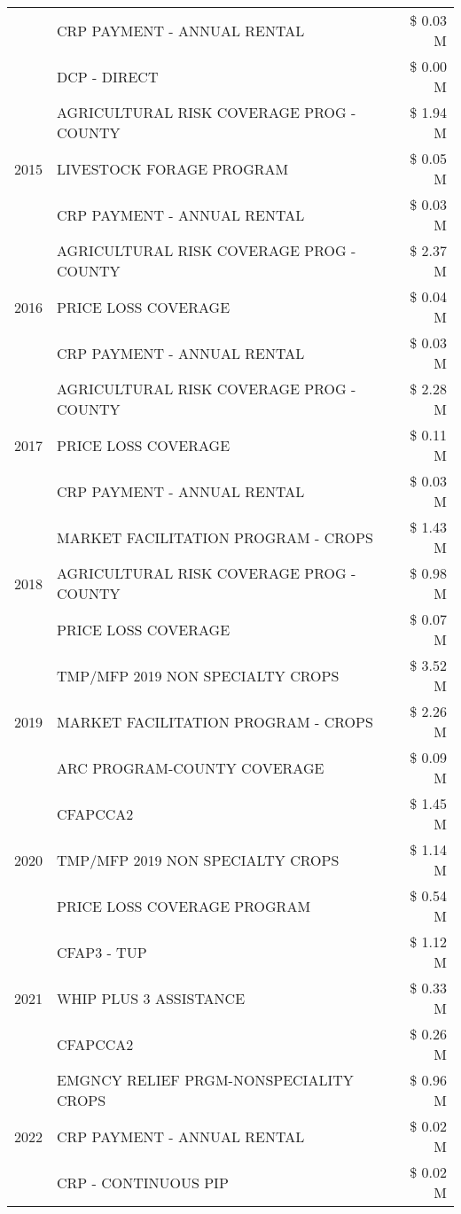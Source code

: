 \begin{tabular}{llr}
 & CRP PAYMENT - ANNUAL RENTAL & \$ 0.03 M \\
 & DCP - DIRECT & \$ 0.00 M \\
\cline{1-3}
\multirow[t]{3}{*}{2015} & AGRICULTURAL RISK COVERAGE PROG - COUNTY & \$ 1.94 M \\
 & LIVESTOCK FORAGE PROGRAM & \$ 0.05 M \\
 & CRP PAYMENT - ANNUAL RENTAL & \$ 0.03 M \\
\cline{1-3}
\multirow[t]{3}{*}{2016} & AGRICULTURAL RISK COVERAGE PROG - COUNTY & \$ 2.37 M \\
 & PRICE LOSS COVERAGE & \$ 0.04 M \\
 & CRP PAYMENT - ANNUAL RENTAL & \$ 0.03 M \\
\cline{1-3}
\multirow[t]{3}{*}{2017} & AGRICULTURAL RISK COVERAGE PROG - COUNTY & \$ 2.28 M \\
 & PRICE LOSS COVERAGE & \$ 0.11 M \\
 & CRP PAYMENT - ANNUAL RENTAL & \$ 0.03 M \\
\cline{1-3}
\multirow[t]{3}{*}{2018} & MARKET FACILITATION PROGRAM - CROPS & \$ 1.43 M \\
 & AGRICULTURAL RISK COVERAGE PROG - COUNTY & \$ 0.98 M \\
 & PRICE LOSS COVERAGE & \$ 0.07 M \\
\cline{1-3}
\multirow[t]{3}{*}{2019} & TMP/MFP 2019 NON SPECIALTY CROPS & \$ 3.52 M \\
 & MARKET FACILITATION PROGRAM - CROPS & \$ 2.26 M \\
 & ARC PROGRAM-COUNTY COVERAGE & \$ 0.09 M \\
\cline{1-3}
\multirow[t]{3}{*}{2020} & CFAPCCA2 & \$ 1.45 M \\
 & TMP/MFP 2019 NON SPECIALTY CROPS & \$ 1.14 M \\
 & PRICE LOSS COVERAGE PROGRAM & \$ 0.54 M \\
\cline{1-3}
\multirow[t]{3}{*}{2021} & CFAP3 - TUP & \$ 1.12 M \\
 & WHIP PLUS 3 ASSISTANCE & \$ 0.33 M \\
 & CFAPCCA2 & \$ 0.26 M \\
\cline{1-3}
\multirow[t]{3}{*}{2022} & EMGNCY RELIEF PRGM-NONSPECIALITY CROPS & \$ 0.96 M \\
 & CRP PAYMENT - ANNUAL RENTAL & \$ 0.02 M \\
 & CRP - CONTINUOUS PIP & \$ 0.02 M \\
\cline{1-3}
\bottomrule
\end{tabular}
